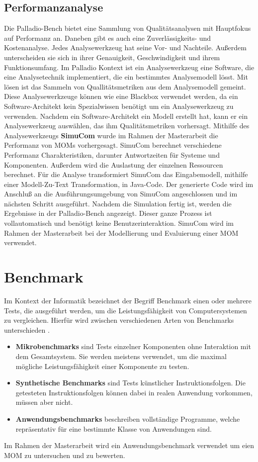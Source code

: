 \subsection{Performanzanalyse}
Die Palladio-Bench bietet eine Sammlung von Qualitätsanalysen mit Hauptfokus auf Performanz an. Daneben gibt es auch eine Zuverlässigkeits- und Kostenanalyse. Jedes Analysewerkzeug hat seine Vor- und Nachteile. Außerdem unterscheiden sie sich in ihrer Genauigkeit, Geschwindigkeit und ihrem Funktionsumfang. Im Palladio Kontext ist ein Analysewerkzeug eine Software, die eine Analysetechnik implementiert, die ein bestimmtes Analysemodell lösst. Mit lösen ist das Sammeln von Quallitätsmetriken aus dem Analysemodell gemeint. Diese Analysewerkzeuge können wie eine Blackbox verwendet werden, da ein Software-Architekt kein Spezialwissen benötigt um ein Analysewerkzeug zu verwenden. Nachdem ein Software-Architekt ein Modell erstellt hat, kann er ein Analysewerkzeug auswählen, das ihm Qualitätsmetriken vorhersagt. Mithilfe des Analysewerkzeugs \textbf{SimuCom} wurde im Rahmen der Masterarbeit die Performanz von MOMs vorhergesagt. SimuCom berechnet verschiedene Performanz Charakteristiken, darunter Antwortzeiten für Systeme und Komponenten. Außerdem wird die Auslastung der einzelnen Ressourcen berechnet. Für die Analyse transformiert SimuCom das Eingabemodell, mithilfe einer Modell-Zu-Text Transformation, in Java-Code. Der generierte Code wird im Anschluß an die Ausführungsumgebung von SimuCom angeschlossen und im nächsten Schritt ausgeführt. Nachdem die Simulation fertig ist, werden die Ergebnisse in der Palladio-Bench angezeigt. Dieser ganze Prozess ist vollautomatisch und benötigt keine Benutzerinteraktion. SimuCom wird im Rahmen der Masterarbeit bei der Modellierung und Evaluierung einer MOM verwendet.

\section{Benchmark}
Im Kontext der Informatik bezeichnet der Begriff Benchmark einen oder mehrere Tests, die ausgeführt werden, um die Leistungsfähigkeit von Computersystemen zu vergleichen. Hierfür wird zwischen verschiedenen Arten von Benchmarks unterschieden \cite{Lilja2004}. 
\begin{itemize}
\item \textbf{Mikrobenchmarks} sind Tests einzelner Komponenten ohne Interaktion mit dem Gesamtsystem. Sie werden meistens verwendet, um die maximal mögliche Leistungsfähigkeit einer Komponente zu testen.
\item \textbf{Synthetische Benchmarks} sind Tests künstlicher Instruktionsfolgen. Die getesteten Instruktionsfolgen können dabei in realen Anwendung vorkommen, müssen aber nicht.
\item \textbf{Anwendungsbenchmarks} beschreiben vollständige Programme, welche repräsentativ für eine bestimmte Klasse von Anwendungen sind. 
\end{itemize}
Im Rahmen der Masterarbeit wird ein Anwendungsbenchmark verwendet um eien MOM zu untersuchen und zu bewerten.




